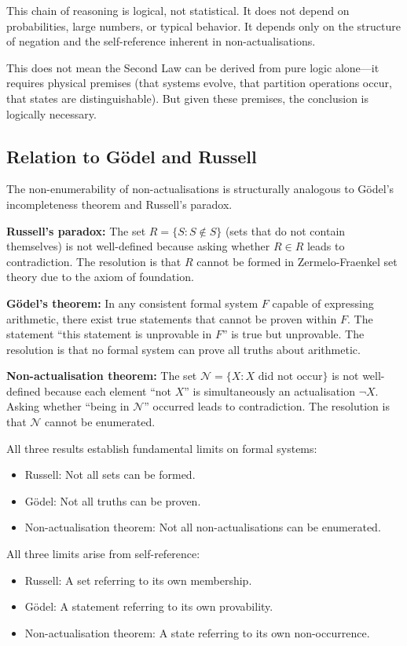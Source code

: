 \documentclass[twocolumn,10pt]{article}
\theoremstyle{definition}
\theoremstyle{remark}
\begin{document}
This chain of reasoning is logical, not statistical. It does not depend on probabilities, large numbers, or typical behavior. It depends only on the structure of negation and the self-reference inherent in non-actualisations.

This does not mean the Second Law can be derived from pure logic alone—it requires physical premises (that systems evolve, that partition operations occur, that states are distinguishable). But given these premises, the conclusion is logically necessary.

\subsection{Relation to Gödel and Russell}

The non-enumerability of non-actualisations is structurally analogous to Gödel's incompleteness theorem and Russell's paradox.

\textbf{Russell's paradox:} The set $R = \{S : S \notin S\}$ (sets that do not contain themselves) is not well-defined because asking whether $R \in R$ leads to contradiction. The resolution is that $R$ cannot be formed in Zermelo-Fraenkel set theory due to the axiom of foundation.

\textbf{Gödel's theorem:} In any consistent formal system $F$ capable of expressing arithmetic, there exist true statements that cannot be proven within $F$. The statement ``this statement is unprovable in $F$'' is true but unprovable. The resolution is that no formal system can prove all truths about arithmetic.

\textbf{Non-actualisation theorem:} The set $\mathcal{N} = \{X : X \text{ did not occur}\}$ is not well-defined because each element ``not $X$'' is simultaneously an actualisation $\neg X$. Asking whether ``being in $\mathcal{N}$'' occurred leads to contradiction. The resolution is that $\mathcal{N}$ cannot be enumerated.

All three results establish fundamental limits on formal systems:
\begin{itemize}
\item Russell: Not all sets can be formed.
\item Gödel: Not all truths can be proven.
\item Non-actualisation theorem: Not all non-actualisations can be enumerated.
\end{itemize}

All three limits arise from self-reference:
\begin{itemize}
\item Russell: A set referring to its own membership.
\item Gödel: A statement referring to its own provability.
\item Non-actualisation theorem: A state referring to its own non-occurrence.
\end{itemize}
\end{document}
